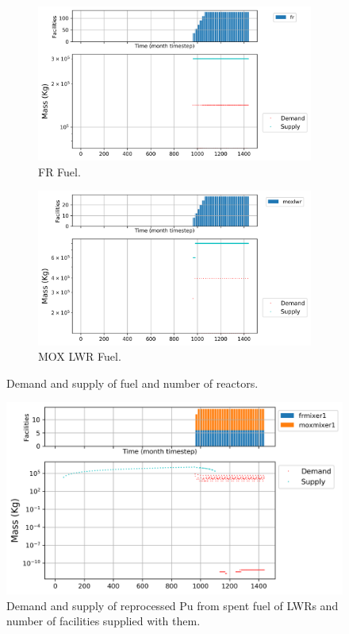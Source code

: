 \documentclass[11pt]{article}
\begin{document}
\begin{figure}[H]
	\centering
	\begin{subfigure}[]{0.45\textwidth}
		\centering
		\includegraphics[width=\linewidth]{29-figures/0-poly-frmixerout.png} 
		\caption{FR Fuel.}
		\label{fig:29-frmixerout}
	\end{subfigure}
	\vspace{1cm}
	\begin{subfigure}[]{0.45\textwidth}
		\centering
		\includegraphics[width=\linewidth]{29-figures/0-poly-moxmixerout.png} 
		\caption{MOX LWR Fuel.}
		\label{fig:29-moxmixerout}
	\end{subfigure}
	\hfill
	\caption{Demand and supply of fuel and number of reactors.}
	\label{fig:29-mix}
\end{figure}

\begin{figure}[H]
	\centering
	\includegraphics[width=\textwidth]{29-figures/0-poly-lwrpu.png} 
	\hfill
	\caption{Demand and supply of reprocessed Pu from spent fuel of LWRs and number of facilities supplied with them.}
	\label{fig:29-pu1}
\end{figure}
\end{document}
